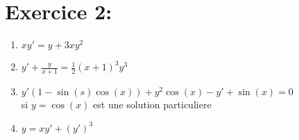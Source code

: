 \documentclass[a4paper,12pt]{article}
\begin{document}

\section*{Exercice 2:}
\begin{enumerate}
	\item $xy' = y + 3xy^2$
	
	\item $y' + \frac{y}{x+1} = \frac{1}{2} (x+1)^3 y^3$ \\
	
	
	\item $y' (1 -\sin(s)\cos(x)) + y^2\cos(x) -y' + \sin(x) = 0$ \\ si $y = \cos(x)$ est une solution particuliere
	
	\item $y = xy' + (y')^3$
\end{enumerate}
\end{document}
